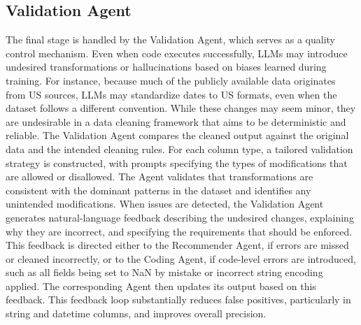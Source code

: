 \subsection{Validation Agent}
The final stage is handled by the Validation Agent, which serves as a quality control mechanism. 
Even when code executes successfully, LLMs may introduce undesired transformations or hallucinations based on biases learned during training. 
For instance, because much of the  publicly available data originates from US sources, LLMs may standardize dates to US formats, even when the dataset follows a different convention. 
While these changes may seem minor, they are undesirable in a data cleaning framework that aims to be deterministic and reliable. 
\newline\newline
The Validation Agent compares the cleaned output against the original data and the intended cleaning rules. 
For each column type, a tailored validation strategy is constructed, with prompts specifying the types of modifications that are allowed or disallowed. 
The Agent validates that transformations are consistent with the dominant patterns in the dataset and identifies any unintended modifications. 
When issues are detected, the Validation Agent generates natural-language feedback describing the undesired changes, explaining why they are incorrect, and specifying the requirements that should be enforced. 
This feedback is directed either to the Recommender Agent, if errors are missed or cleaned incorrectly, or to the Coding Agent, if code-level errors are introduced, such as all fields being set to NaN by mistake or incorrect string encoding applied. 
The corresponding Agent then updates its output based on this feedback. 
This feedback loop substantially reduces false positives, particularly in string and datetime columns, and improves overall precision.

